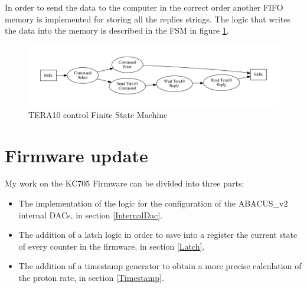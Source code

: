 \noindent In order to send the data to the computer in the correct order another FIFO memory is implemented for storing all the replies strings.
The logic that writes the data into the memory is described in the FSM in figure \ref{fig:fsmFIFO2}.
\begin{figure}[H]
	\centering
	\includegraphics[width=1.0\linewidth]{FSMdiagrams/TERA10controll.pdf}
	\caption{TERA10 control Finite State Machine}
	\label{fig:fsmFIFO2}
\end{figure}  

\section{Firmware update}
My work on the KC705 Firmware can be divided into three parts:
\begin{itemize}
	\item The implementation of the logic for the configuration of the ABACUS\_v2 internal DACs, in section \ref{InternalDac}. 
	\item The addition of a latch logic in order to save into a register the current state of every counter in the firmware, in section \ref{Latch}.
	\item The addition of a timestamp generator to obtain a more precise calculation of the proton rate, in section \ref{Timestamp}. 
\end{itemize}

